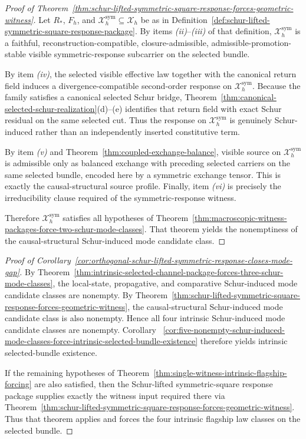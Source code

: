 \begin{proof}[Proof of Theorem~\ref{thm:schur-lifted-symmetric-square-response-forces-geometric-witness}]
\label{proof:thm:schur-lifted-symmetric-square-response-forces-geometric-witness}
Let \(R_\ast\), \(F_h\), and
\(\mathcal X_h^{\mathrm{sym}}\subseteq \mathcal X_h\) be as in
Definition~\ref{def:schur-lifted-symmetric-square-response-package}. By items
\emph{(ii)}--\emph{(iii)} of that definition,
\(\mathcal X_h^{\mathrm{sym}}\) is a faithful,
reconstruction-compatible, closure-admissible, admissible-promotion-stable
visible symmetric-response subcarrier on the selected bundle.

By item \emph{(iv)}, the selected visible effective law together with the
canonical return field induces a divergence-compatible
second-order response on \(\mathcal X_h^{\mathrm{sym}}\). Because the family
satisfies a canonical selected Schur bridge,
Theorem~\ref{thm:canonical-selected-schur-realization}(d)--(e) identifies that
return field with exact Schur residual on the same selected cut. Thus the
response on \(\mathcal X_h^{\mathrm{sym}}\) is genuinely Schur-induced rather
than an independently inserted constitutive term.

By item \emph{(v)} and Theorem~\ref{thm:coupled-exchange-balance}, visible
source on \(\mathcal X_h^{\mathrm{sym}}\) is admissible only as balanced
exchange with preceding selected carriers on the same selected bundle, encoded
here by a symmetric exchange tensor. This is exactly the causal-structural
source profile. Finally, item \emph{(vi)} is precisely the irreducibility
clause required of the symmetric-response witness.

Therefore \(\mathcal X_h^{\mathrm{sym}}\) satisfies all hypotheses of
Theorem~\ref{thm:macroscopic-witness-packages-force-two-schur-mode-classes}.
That theorem yields the nonemptiness of the causal-structural Schur-induced
mode candidate class.
\end{proof}

\begin{proof}[Proof of Corollary~\ref{cor:orthogonal-schur-lifted-symmetric-response-closes-mode-gap}]
\label{proof:cor:orthogonal-schur-lifted-symmetric-response-closes-mode-gap}
By
Theorem~\ref{thm:intrinsic-selected-channel-package-forces-three-schur-mode-classes},
the local-state, propagative, and comparative Schur-induced mode candidate
classes are nonempty. By
Theorem~\ref{thm:schur-lifted-symmetric-square-response-forces-geometric-witness},
the causal-structural Schur-induced mode candidate class is also nonempty.
Hence all four intrinsic Schur-induced mode candidate classes are nonempty.
Corollary~
\ref{cor:five-nonempty-schur-induced-mode-classes-force-intrinsic-selected-bundle-existence}
therefore yields intrinsic selected-bundle existence.

If the remaining hypotheses of
Theorem~\ref{thm:single-witness-intrinsic-flagship-forcing} are also satisfied,
then the Schur-lifted symmetric-square response package supplies exactly the
witness input required there via
Theorem~\ref{thm:schur-lifted-symmetric-square-response-forces-geometric-witness}.
Thus that theorem applies and forces the four intrinsic flagship law classes
on the selected bundle.
\end{proof}

